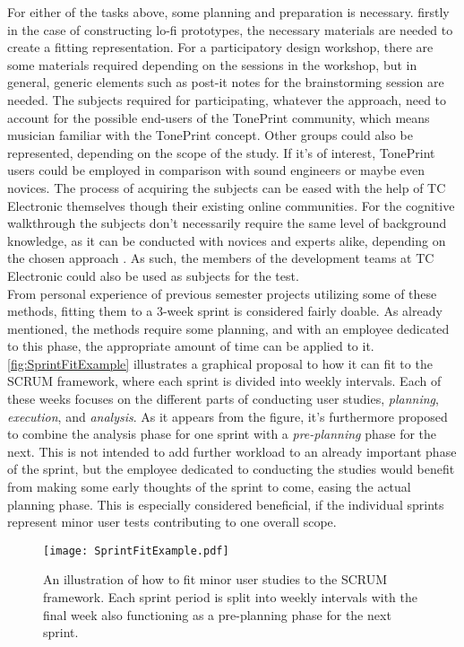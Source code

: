 \noindent
For either of the tasks above, some planning and preparation is necessary. firstly in the case of constructing lo-fi prototypes, the necessary materials are needed to create a fitting representation. For a participatory design workshop, there are some materials required depending on the sessions in the workshop, but in general, generic elements such as post-it notes for the brainstorming session are needed. The subjects required for participating, whatever the approach, need to account for the possible end-users of the TonePrint community, which means musician familiar with the TonePrint concept. Other groups could also be represented, depending on the scope of the study. If it's of interest, TonePrint users could be employed in comparison with sound engineers or maybe even novices. The process of acquiring the subjects can be eased with the help of TC Electronic themselves though their existing online communities. For the cognitive walkthrough the subjects don't necessarily require the same level of background knowledge, as it can be conducted with novices and experts alike, depending on the chosen approach \parencite{WEB:CognitiveWalkthrough}. As such, the members of the development teams at TC Electronic could also be used as subjects for the test.\\

\noindent
From personal experience of previous semester projects utilizing some of these methods, fitting them to a 3-week sprint is considered fairly doable. As already mentioned, the methods require some planning, and with an employee dedicated to this phase, the appropriate amount of time can be applied to it. \autoref{fig:SprintFitExample} illustrates a graphical proposal to how it can fit to the SCRUM framework, where each sprint is divided into weekly intervals. Each of these weeks focuses on the different parts of conducting user studies, \textit{planning}, \textit{execution}, and \textit{analysis}. As it appears from the figure, it's furthermore proposed to combine the analysis phase for one sprint with a \textit{pre-planning} phase for the next. This is not intended to add further workload to an already important phase of the sprint, but the employee dedicated to conducting the studies would benefit from making some early thoughts of the sprint to come, easing the actual planning phase. This is especially considered beneficial, if the individual sprints represent minor user tests contributing to one overall scope.
%
\begin{figure}[H]
	\centering
	\texttt{[image: SprintFitExample.pdf]}
	\caption{An illustration of how to fit minor user studies to the SCRUM framework. Each sprint period is split into weekly intervals with the final week also functioning as a pre-planning phase for the next sprint.}
	\label{fig:SprintFitExample}
\end{figure}


